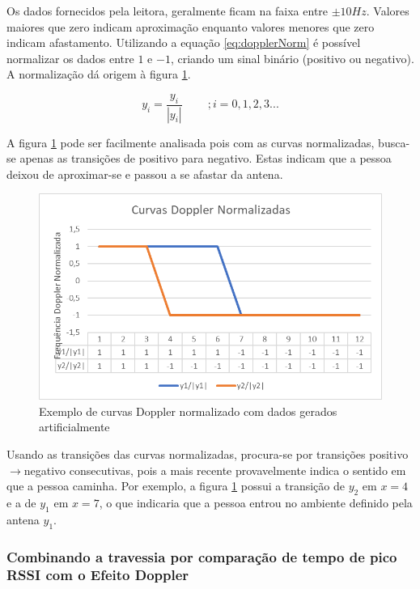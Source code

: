     Os dados fornecidos pela leitora, geralmente ficam na faixa entre $\pm 10 Hz$. Valores maiores que zero indicam aproximação enquanto valores menores que zero indicam afastamento. Utilizando a equação \ref{eq:dopplerNorm} é possível normalizar os dados entre $1$ e $-1$, criando um sinal binário (positivo ou negativo). A normalização dá origem à figura \ref{fig:Doppler_norm_MET}.
    
    \begin{equation}
        y_i = \frac{y_i}{|y_i|} \ \ \ \ \ \ \ \ \ \ ; i = 0, 1, 2, 3 ...
        \label{eq:dopplerNorm}
    \end{equation}

A figura \ref{fig:Doppler_norm_MET} pode ser facilmente analisada pois com as curvas normalizadas, busca-se apenas as transições de positivo para negativo. Estas indicam que a pessoa deixou de aproximar-se e passou a se afastar da antena.
 
  \begin{figure}[H]
    \centering
    \includegraphics[width=0.8\linewidth]{figs/Metodologia/image007.png}
    \caption{Exemplo de curvas Doppler normalizado com dados gerados artificialmente}
    \label{fig:Doppler_norm_MET}
\end{figure}

Usando as transições das curvas normalizadas, procura-se por transições positivo$\rightarrow$negativo consecutivas, pois a mais recente provavelmente indica o sentido em que a pessoa caminha. Por exemplo, a figura \ref{fig:Doppler_norm_MET} possui a transição de $y_2$ em $x=4$ e a de $y_1$ em $x=7$, o que indicaria que a pessoa entrou no ambiente definido pela antena $y_1$.
 
 \subsubsection{Combinando a travessia por comparação de tempo de pico RSSI com o Efeito Doppler} \label{section:RSSI+doppler_met}
 
